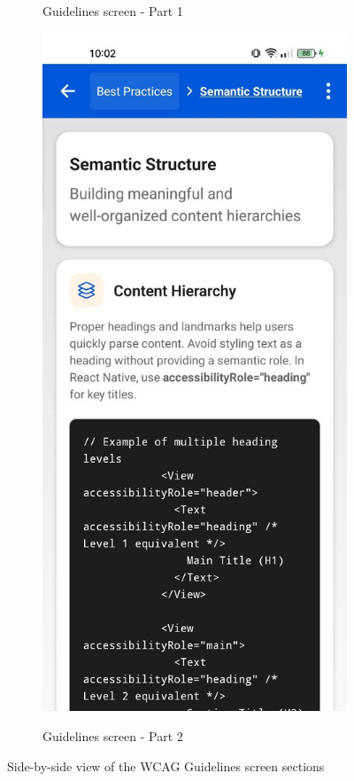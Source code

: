 \begin{figure}[ht]
\begin{subfigure}[b]{0.48\textwidth}
        \caption{Guidelines screen - Part 1}
        \label{fig:guidelines-left}
    \end{subfigure}
    \hfill
    \begin{subfigure}[b]{0.48\textwidth}
        \centering
        \includegraphics[width=\linewidth, alt={Second part of the WCAG guidelines screen}]{img/guidelines2.jpg}
        \caption{Guidelines screen - Part 2}
        \label{fig:guidelines-right}
    \end{subfigure}
    \caption{Side-by-side view of the WCAG Guidelines screen sections}
    \label{fig:guidelines_screens_sidebyside}
\end{figure}

